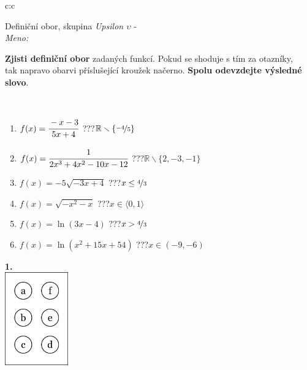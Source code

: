 \documentclass[10pt]{report}
\begin{document}
\begin{tabular}{c:c}
\begin{minipage}[c][104.5mm][t]{0.5\linewidth}
\begin{center}
\vspace{7mm}
{\huge Definiční obor, skupina \textit{Upsilon $\upsilon$} -}\\[5mm]
\textit{Meno:}\phantom{xxxxxxxxxxxxxxxxxxxxxxxxxxxxxxxxxxxxxxxxxxxxxxxxxxxxxxxxxxxxxxxxx}\\[5mm]
\begin{minipage}{0.95\linewidth}
\textbf{Zjisti definiční obor} zadaných funkcí. Pokud se shoduje s tím za otazníky,\\tak napravo obarvi příslušející kroužek načerno. \textbf{Spolu odevzdejte výsledné slovo}.
\end{minipage}
\\[1mm]
\begin{minipage}{0.79\linewidth}
\begin{center}
\begin{varwidth}{\linewidth}
\begin{enumerate}
\normalsizerrr
\item $f(x)=\cfrac{-x-3}{5x+4}$\quad \dotfill\; ???\;\dotfill \quad $\mathbb{R}\smallsetminus\{\nicefrac{-4}{5}\}$
\item $f(x)=\cfrac{1}{2x^3+4x^2-10x-12}$\quad \dotfill\; ???\;\dotfill \quad $\mathbb{R}\smallsetminus\{2,-3,-1\}$
\item $f(x)=-5\sqrt{-3x+4}$\quad \dotfill\; ???\;\dotfill \quad $x\leq\nicefrac{4}{3}$
\item $f(x)=\sqrt{-x^2-x}$\quad \dotfill\; ???\;\dotfill \quad $x\in\langle0 , 1\rangle$
\item $f(x)=\ln{(3x-4)}$\quad \dotfill\; ???\;\dotfill \quad $x>\nicefrac{4}{3}$
\item $f(x)=\ln{(x^2+15x+54)}$\quad \dotfill\; ???\;\dotfill \quad $x\in(-9 , -6)$
\end{enumerate}
\end{varwidth}
\end{center}
\end{minipage}
\begin{minipage}{0.20\linewidth}
\begin{center}
{\Huge\bfseries 1.} \\[2mm]
\includegraphics[height=40mm]{../images/braille.png}

\end{center}
\end{minipage}
\end{center}
\end{minipage}
\end{tabular}
\end{document}
